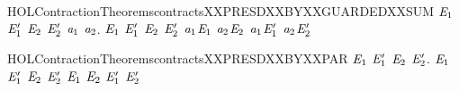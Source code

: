 \newcommand{\HOLContractionTheoremscontractsXXPreOrder}{\UseVerbatim{HOLContractionTheoremscontractsXXPreOrder}}
\begin{SaveVerbatim}{HOLContractionTheoremscontractsXXPRESDXXBYXXGUARDEDXXSUM}
\HOLTokenTurnstile{} \HOLSymConst{\HOLTokenForall{}}\ensuremath{\HOLBoundVar{E}\sb{\mathrm{1}}} \ensuremath{\HOLBoundVar{E}\sb{\mathrm{1}}\sp{\prime}} \ensuremath{\HOLBoundVar{E}\sb{\mathrm{2}}} \ensuremath{\HOLBoundVar{E}\sb{\mathrm{2}}\sp{\prime}} \ensuremath{\HOLBoundVar{a}\sb{\mathrm{1}}} \ensuremath{\HOLBoundVar{a}\sb{\mathrm{2}}}.
       \ensuremath{\HOLBoundVar{E}\sb{\mathrm{1}}}  \ensuremath{\HOLBoundVar{E}\sb{\mathrm{1}}\sp{\prime}} \HOLSymConst{\HOLTokenConj{}} \ensuremath{\HOLBoundVar{E}\sb{\mathrm{2}}}  \ensuremath{\HOLBoundVar{E}\sb{\mathrm{2}}\sp{\prime}} \HOLSymConst{\HOLTokenImp{}}
       \ensuremath{\HOLBoundVar{a}\sb{\mathrm{1}}}\HOLSymConst{\ensuremath{\ldotp}}\ensuremath{\HOLBoundVar{E}\sb{\mathrm{1}}} \HOLSymConst{\ensuremath{+}} \ensuremath{\HOLBoundVar{a}\sb{\mathrm{2}}}\HOLSymConst{\ensuremath{\ldotp}}\ensuremath{\HOLBoundVar{E}\sb{\mathrm{2}}}  \ensuremath{\HOLBoundVar{a}\sb{\mathrm{1}}}\HOLSymConst{\ensuremath{\ldotp}}\ensuremath{\HOLBoundVar{E}\sb{\mathrm{1}}\sp{\prime}} \HOLSymConst{\ensuremath{+}} \ensuremath{\HOLBoundVar{a}\sb{\mathrm{2}}}\HOLSymConst{\ensuremath{\ldotp}}\ensuremath{\HOLBoundVar{E}\sb{\mathrm{2}}\sp{\prime}}
\end{SaveVerbatim}
\newcommand{\HOLContractionTheoremscontractsXXPRESDXXBYXXGUARDEDXXSUM}{\UseVerbatim{HOLContractionTheoremscontractsXXPRESDXXBYXXGUARDEDXXSUM}}
\begin{SaveVerbatim}{HOLContractionTheoremscontractsXXPRESDXXBYXXPAR}
\HOLTokenTurnstile{} \HOLSymConst{\HOLTokenForall{}}\ensuremath{\HOLBoundVar{E}\sb{\mathrm{1}}} \ensuremath{\HOLBoundVar{E}\sb{\mathrm{1}}\sp{\prime}} \ensuremath{\HOLBoundVar{E}\sb{\mathrm{2}}} \ensuremath{\HOLBoundVar{E}\sb{\mathrm{2}}\sp{\prime}}.
       \ensuremath{\HOLBoundVar{E}\sb{\mathrm{1}}}  \ensuremath{\HOLBoundVar{E}\sb{\mathrm{1}}\sp{\prime}} \HOLSymConst{\HOLTokenConj{}} \ensuremath{\HOLBoundVar{E}\sb{\mathrm{2}}}  \ensuremath{\HOLBoundVar{E}\sb{\mathrm{2}}\sp{\prime}} \HOLSymConst{\HOLTokenImp{}}
       \ensuremath{\HOLBoundVar{E}\sb{\mathrm{1}}} \HOLSymConst{\ensuremath{\mid}} \ensuremath{\HOLBoundVar{E}\sb{\mathrm{2}}}  \ensuremath{\HOLBoundVar{E}\sb{\mathrm{1}}\sp{\prime}} \HOLSymConst{\ensuremath{\mid}} \ensuremath{\HOLBoundVar{E}\sb{\mathrm{2}}\sp{\prime}}
\end{SaveVerbatim}
